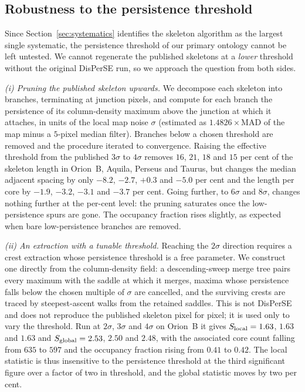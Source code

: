 \documentclass[usenatbib,twoside,twocolumn]{mnras}
\begin{document}
\subsection*{Robustness to the persistence threshold}
\label{sec:persistence}

Since Section~\ref{sec:systematics} identifies the skeleton algorithm as the largest single systematic, the persistence threshold of our primary ontology cannot be left untested. We cannot regenerate the published skeletons at a \emph{lower} threshold without the original DisPerSE run, so we approach the question from both sides.

\smallskip\noindent\emph{(i) Pruning the published skeleton upwards.} We decompose each skeleton into branches, terminating at junction pixels, and compute for each branch the persistence of its column-density maximum above the junction at which it attaches, in units of the local map noise $\sigma$ (estimated as $1.4826\times$MAD of the map minus a $5$-pixel median filter). Branches below a chosen threshold are removed and the procedure iterated to convergence. Raising the effective threshold from the published $3\sigma$ to $4\sigma$ removes $16$, $21$, $18$ and $15$ per cent of the skeleton length in Orion~B, Aquila, Perseus and Taurus, but changes the median adjacent spacing by only $-8.2$, $-2.7$, $+0.3$ and $-5.0$ per cent and the length per core by $-1.9$, $-3.2$, $-3.1$ and $-3.7$ per cent. Going further, to $6\sigma$ and $8\sigma$, changes nothing further at the per-cent level: the pruning saturates once the low-persistence spurs are gone. The occupancy fraction rises slightly, as expected when bare low-persistence branches are removed.

\smallskip\noindent\emph{(ii) An extraction with a tunable threshold.} Reaching the $2\sigma$ direction requires a crest extraction whose persistence threshold is a free parameter. We construct one directly from the column-density field: a descending-sweep merge tree pairs every maximum with the saddle at which it merges, maxima whose persistence falls below the chosen multiple of $\sigma$ are cancelled, and the surviving crests are traced by steepest-ascent walks from the retained saddles. This is not DisPerSE and does not reproduce the published skeleton pixel for pixel; it is used only to vary the threshold. Run at $2\sigma$, $3\sigma$ and $4\sigma$ on Orion~B it gives $S_{\rm local}=1.63$, $1.63$ and $1.63$ and $S_{\rm global}=2.53$, $2.50$ and $2.48$, with the associated core count falling from $635$ to $597$ and the occupancy fraction rising from $0.41$ to $0.42$. The local statistic is thus insensitive to the persistence threshold at the third significant figure over a factor of two in threshold, and the global statistic moves by two per cent.
\end{document}
